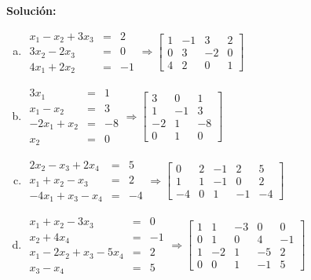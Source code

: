 \documentclass[12pt]{article}
\newenvironment{solucion}
{\begin{mdframed}[backgroundcolor=black!10]
		{\bf Solución:}\\
	}
	{
	\end{mdframed}
}
\newenvironment{preguntas}
{\begin{enumerate}\itemsep12pt
	}
	{
	\end{enumerate}
}
\begin{document}
\begin{preguntas}
\begin{solucion}
\begin{enumerate}[a)]
\item $
			\begin{array}{rcr}
			x_1 -x_2 + 3x_3 & = & 2\\
			3x_2 - 2x_3 & = & 0\\
			4x_1 +2x_2 & = & -1
			\end{array}
			\Longrightarrow 
			\left[
			\begin{array}{ccc|c}
				1 & -1 & 3 & 2\\
				0 & 3 & -2 & 0\\
				4 & 2 & 0 & 1
			\end{array}
			\right]
			$
\item $
			\begin{array}{rcr}
			3x_1 & = & 1\\
			x_1-x_2& = & 3\\
			-2x_1+x_2 & = & -8\\
			x_2 & = & 0
			\end{array}
			\Longrightarrow 
			\left[
			\begin{array}{cc|c}
			3 & 0 & 1\\
			1 &-1 & 3\\
			-2 & 1 & -8\\
			0 & 1 & 0
			\end{array}
			\right]
			$
\item $
			\begin{array}{rcr}
			2x_2 -x_3 +2x_4& = & 5\\
			x_1+x_2 - x_3 & = & 2\\
			-4x_1 +x_3-x_4& = & -4
			\end{array}
			\Longrightarrow 
			\left[
			\begin{array}{cccc|c}
			0 &2 &-1&2&5\\
			1 &1 & -1 & 0 &2\\
			-4 &0 & 1 & -1 &-4
			\end{array}
			\right]
			$
\item $
			\begin{array}{rcr}
			x_1 +x_2-3x_3& = & 0\\
			x_2+4x_4& = & -1\\
			x_1-2x_2+x_3-5x_4 & = & 2\\
			x_3-x_4 & = & 5
			\end{array}
			\Longrightarrow 
			\left[
			\begin{array}{cccc|c}
			1 & 1 & -3 & 0 & 0\\
			0 & 1 & 0 & 4 & -1\\
			1 & -2 & 1 & -5 & 2\\
			0 & 0 & 1 & -1 & 5
			\end{array}
			\right]
			$
\end{enumerate}
\end{solucion}
\end{preguntas}
\end{document}
